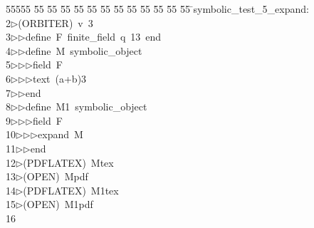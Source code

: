 %
%
\begin{tabbing}
55555 \= 55 \= 55 \= 55 \= 55 \= 55 \= 55 \= 55 \= 55 \= 55 \= 55 \= 55 \= 55 \= \>symbolic\_test\_5\_expand:\\[0pt]
2\>$\triangleright$\>(ORBITER)\ v\ 3\ \\[0pt]
3\>$\triangleright$\>$\triangleright$\>define\ F\ finite\_field\ q\ 13\ end\ \\[0pt]
4\>$\triangleright$\>$\triangleright$\>define\ M\ symbolic\_object\ \\[0pt]
5\>$\triangleright$\>$\triangleright$\>$\triangleright$\>field\ F\ \\[0pt]
6\>$\triangleright$\>$\triangleright$\>$\triangleright$\>text\ (a+b)3\ \\[0pt]
7\>$\triangleright$\>$\triangleright$\>end\ \\[0pt]
8\>$\triangleright$\>$\triangleright$\>define\ M1\ symbolic\_object\ \\[0pt]
9\>$\triangleright$\>$\triangleright$\>$\triangleright$\>field\ F\ \\[0pt]
10\>$\triangleright$\>$\triangleright$\>$\triangleright$\>expand\ M\ \\[0pt]
11\>$\triangleright$\>$\triangleright$\>end\\[0pt]
12\>$\triangleright$\>(PDFLATEX)\ Mtex\\[0pt]
13\>$\triangleright$\>(OPEN)\ Mpdf\\[0pt]
14\>$\triangleright$\>(PDFLATEX)\ M1tex\\[0pt]
15\>$\triangleright$\>(OPEN)\ M1pdf\\[0pt]
16\>\end{tabbing}
